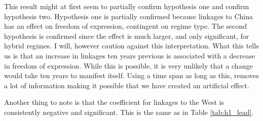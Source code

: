 This result might at first seem to partially confirm hypothesis one and confirm hypothesis two. Hypothesis one is partially confirmed because linkages to China has an effect on freedom of expression, contingent on regime type. The second hypothesis is confirmed since the effect is much larger, and only significant, for hybrid regimes. I will, however caution against this interpretation. What this tells us is that an increase in linkages ten years previous is associated with a decrease in freedom of expression. While this is possible, it is very unlikely that a change would take ten years to manifest itself. Using a time span as long as this, removes a lot of information making it possible that we have created an artificial effect.

Another thing to note is that the coefficient for linkages to the West is consistently negative and significant. This is the same as in Table \ref{tab:h1_lead}.

